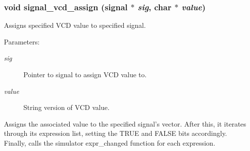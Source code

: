 \subsubsection{\setlength{\rightskip}{0pt plus 5cm}void signal\_\-vcd\_\-assign ({\bf signal} $\ast$ {\em sig}, char $\ast$ {\em value})}\label{signal_8h_a5}


Assigns specified VCD value to specified signal.

\begin{Desc}
\item[Parameters: ]\par
\begin{description}
\item[{\em 
sig}]Pointer to signal to assign VCD value to. \item[{\em 
value}]String version of VCD value.\end{description}
\end{Desc}
Assigns the associated value to the specified signal's vector. After this, it iterates through its expression list, setting the TRUE and FALSE bits accordingly. Finally, calls the simulator expr\_\-changed function for each expression. 